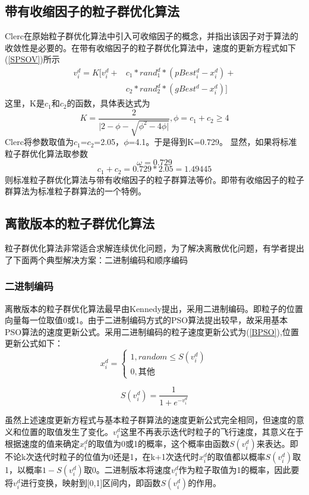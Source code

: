 \subsection{带有收缩因子的粒子群优化算法}
Clerc在原始粒子群优化算法中引入可收缩因子的概念\cite{Clerc2002The}，并指出该因子对于算法的收敛性是必要的。在带有收缩因子的粒子群优化算法中，速度的更新方程式如下(\ref{SPSOV})所示
\begin{equation}
\begin{split}
\label{SPSOV}
v_i^d=K[v_i^d+&c_1*rand_1^d*(pBest_i^d-x_i^d)+\\
&c_2*rand_2^d*(gBest^d-x_i^d)]
\end{split}
\end{equation}
这里，K是$c_1$和$c_2$的函数，具体表达式为
\begin{equation}
K=\frac{2}{|2-\phi-\sqrt{\phi^2-4\phi|}},\phi=c_1+c_2\ge4
\end{equation}
Clerc将参数取值为$c_1$=$c_2$=2.05，$\phi$=4.1。于是得到K=0.729。
显然，如果将标准粒子群优化算法取参数
$$\omega=0.729$$
$$c_1+c_2=0.729*2.05=1.49445$$
则标准粒子群优化算法与带有收缩因子的粒子群算法等价。即带有收缩因子的粒子群算法为标准粒子群算法的一个特例。

\subsection{离散版本的粒子群优化算法}
粒子群优化算法非常适合求解连续优化问题，为了解决离散优化问题，有学者提出了下面两个典型解决方案：二进制编码和顺序编码

\subsubsection{二进制编码}
离散版本的粒子群优化算法最早由Kennedy\cite{Kennedy2002A}提出，采用二进制编码。即粒子的位置向量每一位取值0或1。由于二进制编码方式的PSO算法提出较早，故采用基本PSO算法的速度更新公式。采用二进制编码的粒子速度更新公式为(\ref{BPSO}),位置更新公式如下：
\begin{equation}
x_i^d=
\left\{
\begin{array}{ll}
1,random\le S(v_i^d)\\
0,\mbox{其他}
\end{array}
\right.
\end{equation}

\begin{equation}
S(v_i^d)=\frac{1}{1+e^{-v_i^d}}
\end{equation}

虽然上述速度更新方程式与基本粒子群算法的速度更新公式完全相同，但速度的意义和位置的取值发生了变化。$v_i^d$这里不再表示迭代时粒子的飞行速度，其意义在于根据速度的值来确定$x_i^d$的取值为0或1的概率，这个概率由函数$S(v_i^d)$来表达。即不论k次迭代时粒子的位值为0还是1，在k+1次迭代时$x_i^d$的取值都以概率$S(v_i^d)$取1，以概率$1-S(v_i^d)$取0。二进制版本将速度$v_i^d$作为粒子取值为1的概率，因此要将$v_i^d$进行变换，映射到[0,1]区间内，即函数$S(v_i^d)$的作用。

